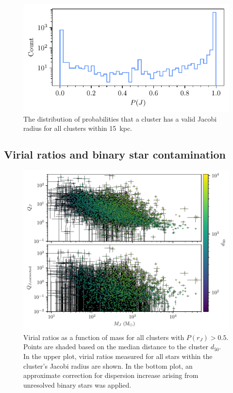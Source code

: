 \begin{figure}[t]
    \centering
    \includegraphics[width=\textwidth]{fig/c4/results_p_jac_distribution.pdf}
    \caption[The distribution of probabilities that a cluster has a valid Jacobi radius]{The distribution of probabilities that a cluster has a valid Jacobi radius for all clusters within 15~kpc.}
    \label{fig:dynamics:results:jacobi_radii_distribution}
\end{figure}


\subsection{Virial ratios and binary star contamination}
\label{sec:dynamics:results:virial}

\begin{figure}[t]
    \centering
    \includegraphics[width=\textwidth]{fig/c4/results_virial_vs_mass.pdf}
    \caption[Virial ratios as a function of mass for all clusters with $P(r_J) > 0.5$]{Virial ratios as a function of mass for all clusters with $P(r_J) > 0.5$. Points are shaded based on the median distance to the cluster $d_{50}$. In the upper plot, virial ratios measured for all stars within the cluster's Jacobi radius are shown. In the bottom plot, an approximate correction for dispersion increase arising from unresolved binary stars was applied.}
    \label{fig:dynamics:results:virial_vs_mass}
\end{figure}

